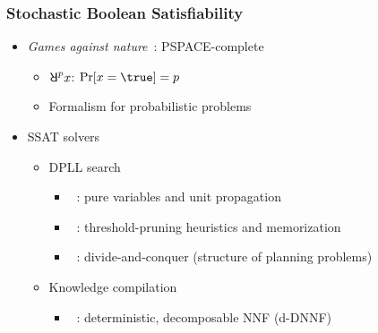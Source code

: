 \begin{frame}
      \frametitle{Stochastic Boolean Satisfiability}
      \begin{itemize}
            \item \textit{Games against nature}~\cite{Papadimitriou1985}: PSPACE-complete~\cite{Stockmeyer1973}
                  \begin{itemize}
                        \item $\random{p}x$: $\spb{x=\true}=p$
                        \item Formalism for probabilistic problems~\cite{SATHandbook-SSAT}
                  \end{itemize}
                  \pause
            \item SSAT solvers
                  \begin{itemize}
                        \item DPLL search~\cite{Davis1962}
                              \begin{itemize}
                                    \item \maxplan~\cite{Majercik1998}: pure variables and unit propagation
                                    \item \zander~\cite{Majercik2003}: threshold-pruning heuristics and memorization
                                    \item \dcssat~\cite{Majercik2005}: divide-and-conquer (structure of planning problems)
                              \end{itemize}
                        \item Knowledge compilation~\cite{Darwiche2002KnowledgeCompilation}
                              \begin{itemize}
                                    \item \complan~\cite{Huang2006}: deterministic, decomposable NNF (d-DNNF)~\cite{Darwiche2001,Darwiche2002dDNNF}
                              \end{itemize}
                  \end{itemize}
      \end{itemize}
\end{frame}